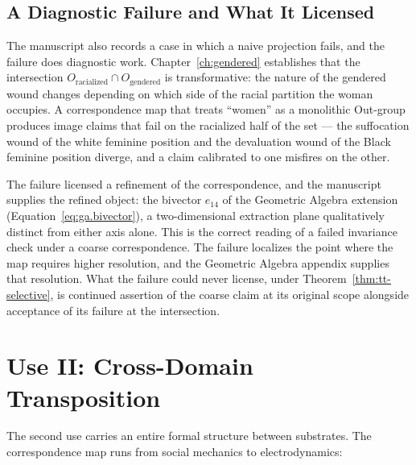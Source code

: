\subsection{A Diagnostic Failure and What It Licensed}

The manuscript also records a case in which a naive projection fails, and the failure does
diagnostic work. Chapter~\ref{ch:gendered} establishes that the intersection
$O_{\text{racialized}} \cap O_{\text{gendered}}$ is transformative: the nature of the gendered
wound changes depending on which side of the racial partition the woman occupies. A correspondence
map that treats ``women'' as a monolithic Out-group produces image claims that fail on the
racialized half of the set --- the suffocation wound of the white feminine position and the
devaluation wound of the Black feminine position diverge, and a claim calibrated to one misfires
on the other.

The failure licensed a refinement of the correspondence, and the manuscript supplies the refined
object: the bivector $e_{14}$ of the Geometric Algebra extension
(Equation~\ref{eq:ga.bivector}), a two-dimensional extraction plane qualitatively distinct from
either axis alone. This is the correct reading of a failed invariance check under a coarse
correspondence. The failure localizes the point where the map requires higher resolution, and the
Geometric Algebra appendix supplies that resolution. What the failure could never license, under
Theorem~\ref{thm:tt-selective}, is continued assertion of the coarse claim at its original scope
alongside acceptance of its failure at the intersection.

\section{Use II: Cross-Domain Transposition}
\label{sec:tt_cross_domain}

The second use carries an entire formal structure between substrates. The correspondence map runs
from social mechanics to electrodynamics:

